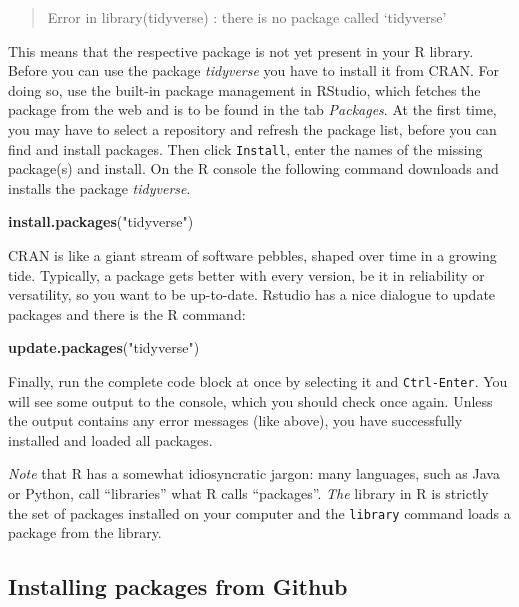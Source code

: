\documentclass[]{svmono}
\newenvironment{Shaded}{\begin{snugshade}}{\end{snugshade}}
\newcommand{\KeywordTok}[1]{\textcolor[rgb]{0.13,0.29,0.53}{\textbf{#1}}}
\newcommand{\StringTok}[1]{\textcolor[rgb]{0.31,0.60,0.02}{#1}}
\newcommand{\NormalTok}[1]{#1}
\begin{document}
\begin{quote}
Error in library(tidyverse) : there is no package called `tidyverse'
\end{quote}

This means that the respective package is not yet present in your R
library. Before you can use the package \emph{tidyverse} you have to
install it from CRAN. For doing so, use the built-in package management
in RStudio, which fetches the package from the web and is to be found in
the tab \emph{Packages}. At the first time, you may have to select a
repository and refresh the package list, before you can find and install
packages. Then click \texttt{Install}, enter the names of the missing
package(s) and install. On the R console the following command downloads
and installs the package \emph{tidyverse}.

\begin{Shaded}
\begin{Highlighting}[]
\KeywordTok{install.packages}\NormalTok{(}\StringTok{"tidyverse"}\NormalTok{)}
\end{Highlighting}
\end{Shaded}

CRAN is like a giant stream of software pebbles, shaped over time in a
growing tide. Typically, a package gets better with every version, be it
in reliability or versatility, so you want to be up-to-date. Rstudio has
a nice dialogue to update packages and there is the R command:

\begin{Shaded}
\begin{Highlighting}[]
\KeywordTok{update.packages}\NormalTok{(}\StringTok{"tidyverse"}\NormalTok{)}
\end{Highlighting}
\end{Shaded}

Finally, run the complete code block at once by selecting it and
\texttt{Ctrl-Enter}. You will see some output to the console, which you
should check once again. Unless the output contains any error messages
(like above), you have successfully installed and loaded all packages.

\emph{Note} that R has a somewhat idiosyncratic jargon: many languages,
such as Java or Python, call ``libraries'' what R calls ``packages''.
\emph{The} library in R is strictly the set of packages installed on
your computer and the \texttt{library} command loads a package from the
library.

\subsection{Installing packages from
Github}\label{installing-packages-from-github}
\end{document}
